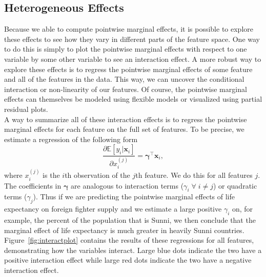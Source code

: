\documentclass[12pt]{article}
\newcommand{\x}{\mathbf{x}}
\newcommand{\E}{\mathbb{E}}
\begin{document}
\subsection{Heterogeneous Effects}

Because we able to compute pointwise marginal effects, it is possible to explore these effects to see how they vary in different parts of the feature space. One way to do this is simply to plot the pointwise marginal effects with respect to one variable by some other variable to see an interaction effect. A more robust way to explore these effects is to regress the pointwise marginal effects of some feature and all of the features in the data. This way, we can uncover the conditional interaction or non-linearity of our features. Of course, the pointwise marginal effects can themselves be modeled using flexible models or visualized using partial residual plots.  \\ 

A way to summarize all of these interaction effects is to regress the pointwise marginal effects for each feature on the full set of features. To be precise, we estimate a regression of the following form
$$ \frac{\partial\E[y_i|\x_i]}{\partial x^{(j)}_i} = \bm{\gamma}^\top \x_i,$$
where $x^{(j)}_i$ is the $i$th observation of the $j$th feature. We do this for all features $j$. The coefficients in $\bm{\gamma}$ are analogous to interaction terms ($\gamma_i \; \forall \; i \neq j$) or quadratic terms ($\gamma_j$). Thus if we are predicting the pointwise marginal effects of life expectancy on foreign fighter supply and we estimate a large positive $\gamma_i$ on, for example, the percent of the population that is Sunni, we then conclude that the marginal effect of life expectancy is much greater in heavily Sunni countries. Figure~\ref{fig:interactplot} contains the results of these regressions for all features, demonstrating how the variables interact. Large blue dots indicate the two have a positive interaction effect while large red dots indicate the two have a negative interaction effect.
\end{document}
